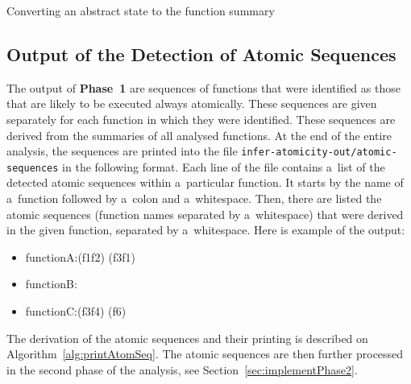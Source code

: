 \begin{algorithm}[hbt]


    \caption{Converting an abstract state to the function summary}
    \label{alg:phase1AstateToSum}
\end{algorithm}


\subsection{Output of the Detection of Atomic Sequences}
\label{sec:implementPhase1Out}

The output of \textbf{Phase~1} are sequences of functions that were
identified as those that are likely to be executed always atomically.
These sequences are given separately for each function in which they were
identified. These sequences are derived from the summaries of all analysed
functions. At the end of the entire analysis, the sequences are printed
into the file \texttt{infer-atomicity-out/atomic-sequences} in the
following format. Each line of the file contains a~list of the detected
atomic sequences within a~particular function. It starts by the name of
a~function followed by a~colon and a~whitespace. Then, there are listed the
atomic sequences (function names separated by a~whitespace) that were
derived in the given function, separated by a~whitespace. Here is example
of the output:
\begin{samepage}
    \begin{itemize}[label=]
        \tt
        \setlength\itemsep{0em}

        \item
            functionA:{\textvisiblespace}(f1{\textvisiblespace}f2)%
            {\textvisiblespace}(f3{\textvisiblespace}f1)

        \item
            functionB:{\textvisiblespace}

        \item
            functionC:{\textvisiblespace}(f3{\textvisiblespace}f4)%
            {\textvisiblespace}(f6)
    \end{itemize}
\end{samepage}
The derivation of the atomic sequences and their printing is described on
Algorithm~\ref{alg:printAtomSeq}. The atomic sequences are then further
processed in the second phase of the analysis, see
Section~\ref{sec:implementPhase2}.

